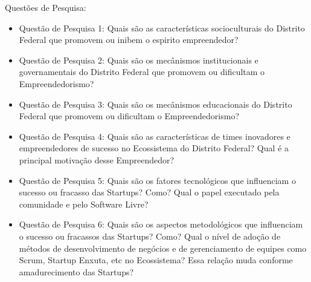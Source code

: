 Questões de Pesquisa:
\begin{itemize}
  \item Questão de Pesquisa 1: Quais são as características socioculturais do Distrito Federal que promovem ou inibem o espirito empreendedor?
  \item Questão de Pesquisa 2: Quais são os mecânismos institucionais e governamentais do Distrito Federal que promovem ou dificultam o Empreendedorismo?
  \item Questão de Pesquisa 3: Quais são os mecânismos educacionais do Distrito Federal que promovem ou dificultam o Empreendedorismo?
  \item Questão de Pesquisa 4: Quais são as características de times inovadores e empreendedores de sucesso no Ecossistema do Distrito Federal? Qual é a principal motivação desse Empreendedor?
  \item Questão de Pesquisa 5: Quais são os fatores tecnológicos que influenciam o sucesso ou fracasso das Startups? Como? Qual o papel executado pela comunidade e pelo Software Livre?
  \item Questão de Pesquisa 6: Quais são os aspectos metodológicos que influenciam o sucesso ou fracassos das Startups? Como? Qual o nível de adoção de métodos de desenvolvimento de negócios
  e de gerenciamento de equipes como Scrum, Startup Enxuta, etc no Ecossistema? Essa relação muda conforme amadurecimento das Startups?
\end{itemize}


